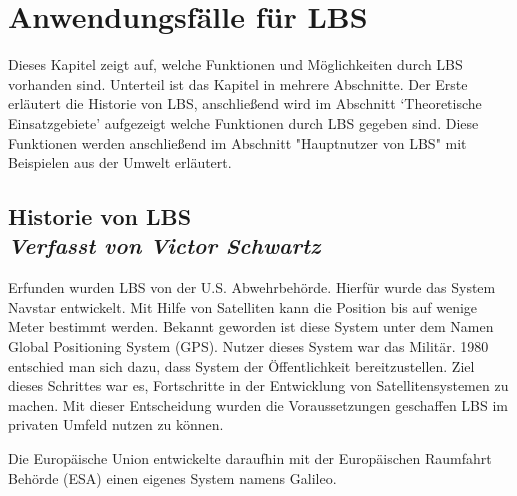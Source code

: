 \section{Anwendungsfälle für LBS}

%
Dieses Kapitel zeigt auf, welche Funktionen und Möglichkeiten durch LBS vorhanden sind. Unterteil ist das Kapitel in mehrere Abschnitte. Der Erste erläutert die Historie von LBS, anschließend wird im Abschnitt `Theoretische Einsatzgebiete' aufgezeigt welche Funktionen durch LBS gegeben sind. Diese Funktionen werden anschließend im Abschnitt "Hauptnutzer von LBS" mit Beispielen aus der Umwelt erläutert.


\subsection[Historie von LBS]{Historie von LBS
 \\ \textnormal{\small{\textit {Verfasst von Victor Schwartz}}}}

Erfunden wurden LBS von der U.S. Abwehrbehörde. Hierfür wurde das System Navstar entwickelt. Mit Hilfe von Satelliten kann die Position bis auf wenige Meter bestimmt werden. Bekannt geworden ist diese System unter dem Namen Global Positioning System (GPS). Nutzer dieses System war das Militär. 1980 entschied man sich dazu, dass System der Öffentlichkeit bereitzustellen. Ziel dieses Schrittes war es, Fortschritte in der Entwicklung von Satellitensystemen zu machen. Mit dieser Entscheidung wurden die Voraussetzungen geschaffen LBS im privaten Umfeld nutzen zu können.\cite{Navstar} 

Die Europäische Union entwickelte daraufhin mit der Europäischen Raumfahrt Behörde (ESA) einen eigenes System namens Galileo.

